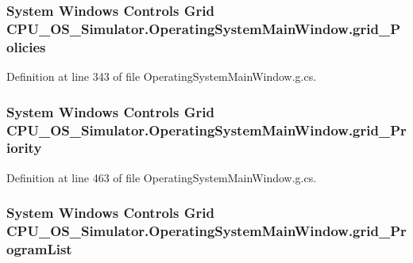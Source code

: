 \subsubsection[{grid\+\_\+\+Policies}]{\setlength{\rightskip}{0pt plus 5cm}System Windows Controls Grid C\+P\+U\+\_\+\+O\+S\+\_\+\+Simulator.\+Operating\+System\+Main\+Window.\+grid\+\_\+\+Policies\hspace{0.3cm}{\ttfamily [package]}}\label{class_c_p_u___o_s___simulator_1_1_operating_system_main_window_a70a570b7188592c1066eccb3ff6b97f3}


Definition at line 343 of file Operating\+System\+Main\+Window.\+g.\+cs.

\hypertarget{class_c_p_u___o_s___simulator_1_1_operating_system_main_window_a0b2ac61c7430b46fa467986e7afd9448}{}
\subsubsection[{grid\+\_\+\+Priority}]{\setlength{\rightskip}{0pt plus 5cm}System Windows Controls Grid C\+P\+U\+\_\+\+O\+S\+\_\+\+Simulator.\+Operating\+System\+Main\+Window.\+grid\+\_\+\+Priority\hspace{0.3cm}{\ttfamily [package]}}\label{class_c_p_u___o_s___simulator_1_1_operating_system_main_window_a0b2ac61c7430b46fa467986e7afd9448}


Definition at line 463 of file Operating\+System\+Main\+Window.\+g.\+cs.

\hypertarget{class_c_p_u___o_s___simulator_1_1_operating_system_main_window_a22160eecd007b7aedf48db6c64eb2da6}{}
\subsubsection[{grid\+\_\+\+Program\+List}]{\setlength{\rightskip}{0pt plus 5cm}System Windows Controls Grid C\+P\+U\+\_\+\+O\+S\+\_\+\+Simulator.\+Operating\+System\+Main\+Window.\+grid\+\_\+\+Program\+List\hspace{0.3cm}{\ttfamily [package]}}\label{class_c_p_u___o_s___simulator_1_1_operating_system_main_window_a22160eecd007b7aedf48db6c64eb2da6}


